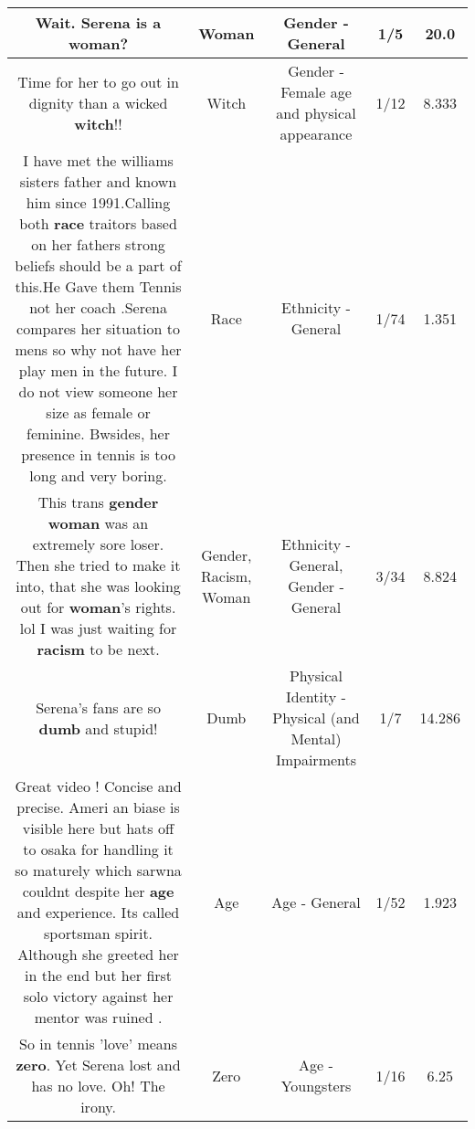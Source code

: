 \documentclass[11pt]{article}
\newlength\mylength
\begin{document}
\begin{center}
\begin{longtable}{|C{.65\mylength}|C{.30\mylength}|C{.12\mylength}|C{.12\mylength}|C{.12\mylength}|}
  \small Wait. Serena is a \textbf{woman}?\normalsize   & Woman & Gender - General & 1/5 & 20.0 \\  \hline
  \small Time for her to go out in dignity than a wicked \textbf{witch}!!\normalsize   & Witch & Gender - Female age and physical appearance & 1/12 & 8.333 \\  \hline
  \small I have met the williams sisters father and known him since 1991.Calling both \textbf{race} traitors based on her fathers strong beliefs should be a part of this.He Gave them Tennis not her coach .Serena compares her situation to mens so why not have her play men in the future. I do not view someone her size as female or feminine. Bwsides, her presence in tennis is too long and very boring.\normalsize   & Race & Ethnicity - General & 1/74 & 1.351 \\  \hline
  \small This trans \textbf{gender} \textbf{woman} was an extremely sore loser. Then she tried to make it into, that she was looking out for \textbf{woman}'s rights. lol I was just waiting for \textbf{racism} to be next.\normalsize   & Gender, Racism, Woman & Ethnicity - General, Gender - General & 3/34 & 8.824 \\  \hline
  \small Serena's fans are so \textbf{dumb} and stupid!\normalsize   & Dumb & Physical Identity - Physical (and Mental) Impairments & 1/7 & 14.286 \\  \hline
  \small Great video ! Concise and precise. Ameri an biase is visible here but hats off to osaka for handling it so maturely which sarwna couldnt despite her \textbf{age} and experience. Its called sportsman spirit. Although she greeted her in the end but her first solo victory against her mentor was ruined .\normalsize   & Age & Age - General & 1/52 & 1.923 \\  \hline
  \small So in tennis 'love' means \textbf{zero}. Yet Serena lost and has no love. Oh! The irony.\normalsize   & Zero & Age - Youngsters & 1/16 & 6.25 \\  \hline

\end{longtable}
\end{center}
\end{document}
